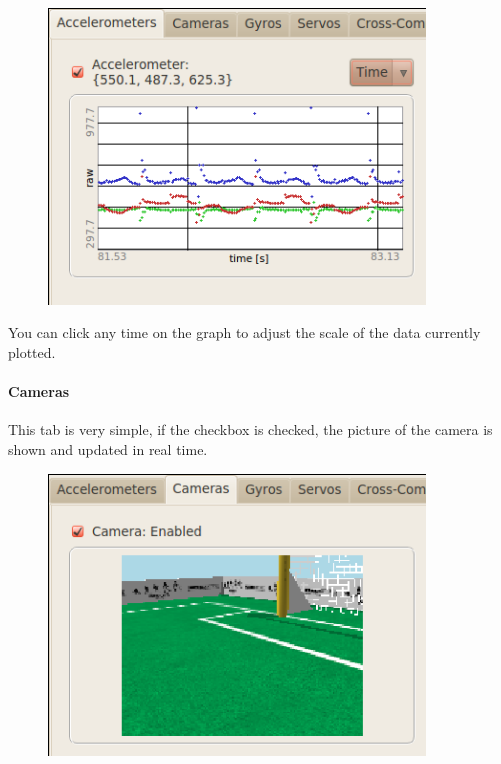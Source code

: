 \documentclass[a4paper, 12pt]{article}  		%
\begin{document}
\begin{figure}[H]
\begin{center}
\includegraphics[width=10cm]{window_accel.png}
\label{window_accel}
\end{center}
\end{figure}

You can click any time on the graph to adjust the scale of the data currently plotted.\\

\newpage
\paragraph*{Cameras}
This tab is very simple, if the checkbox is checked, the picture of the camera is shown and updated in real time.\\

\begin{figure}[H]
\begin{center}
\includegraphics[width=10cm]{window_camera.png}
\label{window_camera}
\end{center}
\end{figure}
\end{document}
